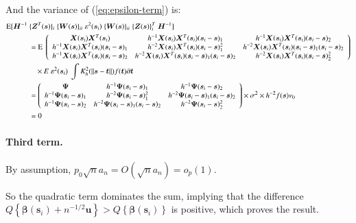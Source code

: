 \documentclass[authoryear, review, 11pt]{elsarticle}
\begin{document}
    
    And the variance of (\ref{eq:epsilon-term}) is:
    \begin{align}
      \text{E} [ \bm{H}^{-1} \; &\{ \bm{Z}^T(\bm{s}) \}_i \; \{ \bm{W}(\bm{s}) \}_{ii} \; \varepsilon^2(\bm{s}_i) \; \{ \bm{W}(\bm{s}) \}_{ii} \; \{ \bm{Z}(\bm{s}) \}^T_i \;   \bm{H}^{-1} ] \notag \\
      &= \text{E} \; \left( \begin{array}{ccc} \bm{X}(\bm{s}_i) \bm{X}^T(\bm{s}_i) & h^{-1} \bm{X}(\bm{s}_i) \bm{X}^T(\bm{s}_i) (\bm{s}_i - \bm{s})_1 & h^{-1} \bm{X}(\bm{s}_i) \bm{X}^T(\bm{s}_i) (\bm{s}_i - \bm{s})_2 \\ h^{-1} \bm{X}(\bm{s}_i) \bm{X}^T(\bm{s}_i) (\bm{s}_i - \bm{s})_1 & h^{-2} \bm{X}(\bm{s}_i) \bm{X}^T(\bm{s}_i) (\bm{s}_i - \bm{s})^2_1 & h^{-2} \bm{X}(\bm{s}_i) \bm{X}^T(\bm{s}_i) (\bm{s}_i - \bm{s})_1 (\bm{s}_i - \bm{s})_2 \\ h^{-1} \bm{X}(\bm{s}_i) \bm{X}^T(\bm{s}_i) (\bm{s}_i - \bm{s})_2 & h^{-2} \bm{X}(\bm{s}_i) \bm{X}^T(\bm{s}_i) (\bm{s}_i - \bm{s})_1 (\bm{s}_i - \bm{s})_2 & h^{-2} \bm{X}(\bm{s}_i) \bm{X}^T(\bm{s}_i) (\bm{s}_i - \bm{s})^2_2 \end{array} \right)  \notag \\
      & \:\:\:\: \times E \; \varepsilon^2(\bm{s}_i) \; \int K^2_h(\| \bm{s} - \bm{t} \|) f(\bm{t}) \partial \bm{t} \notag \\
      &= \left( \begin{array}{ccc} \bm{\Psi} & h^{-1} \bm{\Psi} (\bm{s}_i - \bm{s})_1 & h^{-1} \bm{\Psi} (\bm{s}_i - \bm{s})_2 \\ h^{-1} \bm{\Psi} (\bm{s}_i - \bm{s})_1 & h^{-2}\bm{\Psi} (\bm{s}_i - \bm{s})^2_1 & h^{-2}\bm{\Psi} (\bm{s}_i - \bm{s})_1 (\bm{s}_i - \bm{s})_2 \\ h^{-1} \bm{\Psi} (\bm{s}_i - \bm{s})_2 & h^{-2} \bm{\Psi} (\bm{s}_i - \bm{s})_1 (\bm{s}_i - \bm{s})_2 & h^{-2} \bm{\Psi} (\bm{s}_i - \bm{s})^2_2 \end{array} \right) \times \sigma^2 \times h^{-2} f(\bm{s}) \nu_0 \notag \\
      &= 0
    \end{align}
  
  \paragraph{Third term.} By assumption, $p_0 \sqrt{n} a_n = O(\sqrt{n} a_n) = o_p(1)$.
  
  So the quadratic term dominates the sum, implying that the difference $Q \left\{ \bm{\beta}(\bm{s}_i) + n^{-1/2} \bm{u} \right\} > Q \left\{ \bm{\beta}(\bm{s}_i) \right\}$ is positive, which proves the result.
  
\end{document}
